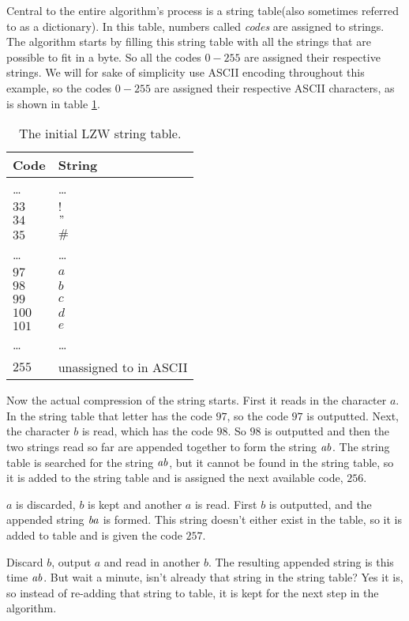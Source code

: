 Central to the entire algorithm's process is a string table(also
sometimes referred to as a dictionary). In this table, numbers called
\textit{codes} are assigned to strings. The algorithm starts by
filling this string table with all the strings that are possible to
fit in a byte. So all the codes $0-255$ are assigned their respective
strings. We will for sake of simplicity use ASCII encoding throughout
this example, so the codes $0-255$ are assigned their respective ASCII
characters, as is shown in table \ref{tab:str-tab-ascii}.

\begin{table}
  \centering
  \begin{tabular}{ll}
    \toprule
    Code & String\\
    \midrule
    \dots & \dots \\
    $33$ & $!$ \\
    $34$ & $"$ \\
    $35$ & $\#$ \\
    \dots & \dots \\
    $97$ & $a$ \\
    $98$ & $b$ \\
    $99$ & $c$ \\
    $100$ & $d$ \\
    $101$ & $e$ \\
    \dots & \dots \\
    $255$ & unassigned to in ASCII \\
    \bottomrule
  \end{tabular}
  \caption{The initial LZW string table.}
  \label{tab:str-tab-ascii}
\end{table}

Now the actual compression of the string starts. First it reads in the
character $a$. In the string table that letter has the code $97$,
so the code $97$ is outputted. Next, the character $b$ is read,
which has the code $98$. So $98$ is outputted and then the two strings
read so far are appended together to form the string $\mathit{ab}$. The
string table is searched for the string $\mathit{ab}$, but it cannot be
found in the string table, so it is added to the string table and is
assigned the next available code, $256$.

$a$ is discarded, $b$ is kept and another $a$ is
read. First $b$ is outputted, and the appended string
$\mathit{ba}$ is formed. This string doesn't either exist in the table,
 so it is added to table and is given the code $257$.

 Discard $b$, output $a$ and read in another $b$. The
 resulting appended string is this time $\mathit{ab}$. But wait a minute,
 isn't already that string in the string table? Yes it is, so instead
 of re-adding that string to table, it is kept for the next step in
 the algorithm.

